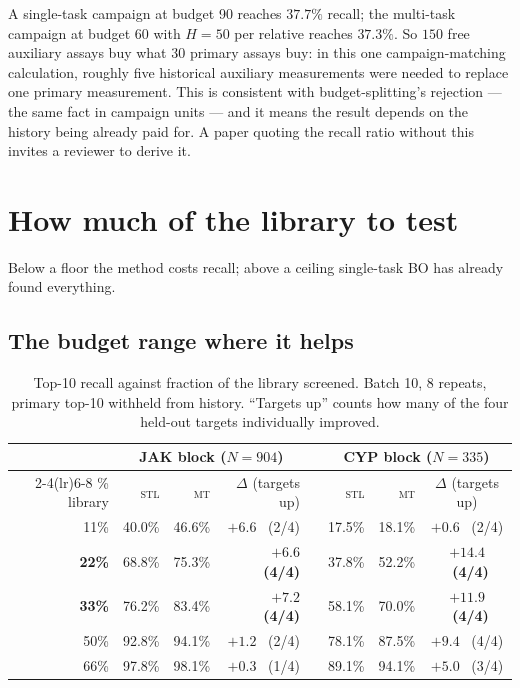 \documentclass[11pt]{article}
\newcommand{\stl}{\textsc{stl}}
\newcommand{\mt}{\textsc{mt}}
\begin{document}
A single-task campaign at budget 90 reaches $37.7\%$ recall; the multi-task
campaign at budget 60 with $H = 50$ per relative reaches $37.3\%$. So $150$ free
auxiliary assays buy what $30$ primary assays buy: in this one campaign-matching calculation, roughly five historical auxiliary
measurements were needed to replace one primary measurement. This is consistent with budget-splitting's
rejection --- the same fact in campaign units --- and it means the result
depends on the history being already paid for. A paper quoting the recall ratio
without this invites a reviewer to derive it.

\section{How much of the library to test}

Below a floor the method costs recall; above a ceiling single-task BO has
already found everything.

\subsection{The budget range where it helps}
\label{sec:window}

\begin{table}[ht]
\centering\small
\begin{tabular}{rrrrcrrc}
\toprule
& \multicolumn{3}{c}{JAK block ($N = 904$)} & &
  \multicolumn{3}{c}{CYP block ($N = 335$)} \\
\cmidrule(lr){2-4}\cmidrule(lr){6-8}
\% library & \stl{} & \mt{} & $\Delta$ (targets up) & &
             \stl{} & \mt{} & $\Delta$ (targets up) \\
\midrule
11\% & 40.0\% & 46.6\% & $+6.6$ \ (2/4) & & 17.5\% & 18.1\% & $+0.6$ \ (2/4) \\
\textbf{22\%} & 68.8\% & 75.3\% & $\mathbf{+6.6}$ \ \textbf{(4/4)} & &
  37.8\% & 52.2\% & $\mathbf{+14.4}$ \ \textbf{(4/4)} \\
\textbf{33\%} & 76.2\% & 83.4\% & $\mathbf{+7.2}$ \ \textbf{(4/4)} & &
  58.1\% & 70.0\% & $\mathbf{+11.9}$ \ \textbf{(4/4)} \\
50\% & 92.8\% & 94.1\% & $+1.2$ \ (2/4) & & 78.1\% & 87.5\% & $+9.4$ \ (4/4) \\
66\% & 97.8\% & 98.1\% & $+0.3$ \ (1/4) & & 89.1\% & 94.1\% & $+5.0$ \ (3/4) \\
\bottomrule
\end{tabular}
\caption{Top-10 recall against fraction of the library screened. Batch 10,
8 repeats, primary top-10 withheld from history. ``Targets up'' counts how many
of the four held-out targets individually improved.}
\label{tab:window}
\end{table}
\end{document}
